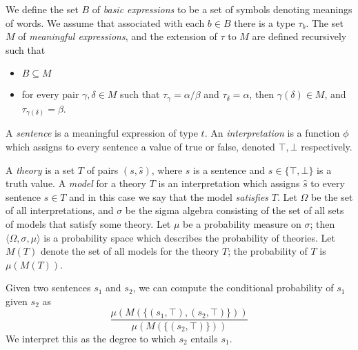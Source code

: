 \documentclass[letterpaper]{article}
\begin{document}
We define the set $B$ of \emph{basic expressions} to be a set of
symbols denoting meanings of words. We assume that associated with
each $b\in B$ there is a type $\tau_b$. The set $M$ of
\emph{meaningful expressions}, and the extension of $\tau$ to $M$ are
defined recursively such that
\begin{itemize}
\item $B\subseteq M$
\item for every pair $\gamma,\delta\in M$ such that $\tau_\gamma =
  \alpha/\beta$ and $\tau_\delta = \alpha$, then $\gamma(\delta)\in
  M$, and $\tau_{\gamma(\delta)} = \beta$.
\end{itemize}

A \emph{sentence} is a meaningful expression of type $t$. An
\emph{interpretation} is a function $\phi$ which assigns to every
sentence a value of true or false, denoted $\top, \bot$ respectively.

A \emph{theory} is a set $T$ of pairs $(s,\hat{s})$, where $s$ is a
sentence and $\hat{s}\in\{\top,\bot\}$ is a truth value. A
\emph{model} for a theory $T$ is an interpretation which assigns
$\hat{s}$ to every sentence $s\in T$ and in this case we say that the model \emph{satisfies} $T$. Let $\Omega$ be the set of all
interpretations, and $\sigma$ be the sigma algebra consisting of the
set of all sets of models that satisfy some theory. Let $\mu$ be a probability measure
on $\sigma$; then $\langle\Omega,\sigma,\mu\rangle$ is a probability
space which describes the probability of theories. Let $M(T)$ denote
the set of all models for the theory $T$; the probability of $T$ is
$\mu(M(T))$.

Given two sentences $s_1$ and $s_2$, we can compute the conditional
probability of $s_1$ given $s_2$ as
$$\frac{\mu(M(\{(s_1, \top), (s_2, \top)\}))}{\mu(M(\{(s_2,\top)\}))}$$
We interpret this as the degree to which $s_2$ entails $s_1$.

\end{document}
